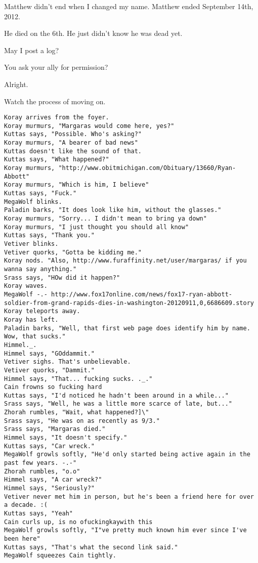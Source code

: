 Matthew didn't end when I changed my name. Matthew ended September 14th, 2012.

\begin{ally}
He died on the 6th. He just didn't know he was dead yet.
\end{ally}
May I post a log?

\begin{ally}
You ask your ally for permission?
\end{ally}
Alright.

Watch the process of moving on.
\newpage

\begin{verbatim}
Koray arrives from the foyer.
Koray murmurs, "Margaras would come here, yes?"
Kuttas says, "Possible. Who's asking?"
Koray murmurs, "A bearer of bad news"
Kuttas doesn't like the sound of that.
Kuttas says, "What happened?"
Koray murmurs, "http://www.obitmichigan.com/Obituary/13660/Ryan-Abbott"
Koray murmurs, "Which is him, I believe"
Kuttas says, "Fuck."
MegaWolf blinks.
Paladin barks, "It does look like him, without the glasses."
Koray murmurs, "Sorry... I didn't mean to bring ya down"
Koray murmurs, "I just thought you should all know"
Kuttas says, "Thank you."
Vetiver blinks.
Vetiver quorks, "Gotta be kidding me."
Koray nods. "Also, http://www.furaffinity.net/user/margaras/ if you wanna say anything."
Srass says, "HOw did it happen?"
Koray waves.
MegaWolf -.- http://www.fox17online.com/news/fox17-ryan-abbott-soldier-from-grand-rapids-dies-in-washington-20120911,0,6686609.story
Koray teleports away.
Koray has left.
Paladin barks, "Well, that first web page does identify him by name. Wow, that sucks."
Himmel._.
Himmel says, "GOddammit."
Vetiver sighs. That's unbelievable.
Vetiver quorks, "Dammit."
Himmel says, "That... fucking sucks. ._."
Cain frowns so fucking hard
Kuttas says, "I'd noticed he hadn't been around in a while..."
Srass says, "Well, he was a little more scarce of late, but..."
Zhorah rumbles, "Wait, what happened?]\"
Srass says, "He was on as recently as 9/3."
Srass says, "Margaras died."
Himmel says, "It doesn't specify."
Kuttas says, "Car wreck."
MegaWolf growls softly, "He'd only started being active again in the past few years. -.-"
Zhorah rumbles, "o.o"
Himmel says, "A car wreck?"
Himmel says, "Seriously?"
Vetiver never met him in person, but he's been a friend here for over a decade. :(
Kuttas says, "Yeah"
Cain curls up, is no ofuckingkaywith this
MegaWolf growls softly, "I"ve pretty much known him ever since I've been here"
Kuttas says, "That's what the second link said."
MegaWolf squeezes Cain tightly.

\end{verbatim}
